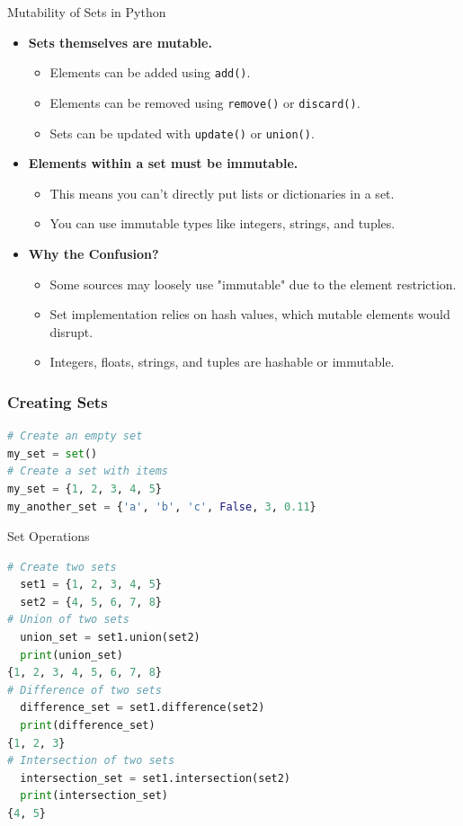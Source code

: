\begin{frame}{Mutability of Sets in Python}
    \begin{itemize}
      \item \textbf{Sets themselves are mutable.}
        \begin{itemize}
          \item Elements can be added using \texttt{add()}.
          \item Elements can be removed using \texttt{remove()} or \texttt{discard()}.
          \item Sets can be updated with \texttt{update()} or \texttt{union()}.
        \end{itemize}
      \item \textbf{Elements within a set must be immutable.}
        \begin{itemize}
          \item This means you can't directly put lists or dictionaries in a set.
          \item You can use immutable types like integers, strings, and tuples.
        \end{itemize}
      \item \textbf{Why the Confusion?}
        \begin{itemize}
          \item Some sources may loosely use "immutable" due to the element restriction.
          \item Set implementation relies on hash values, which mutable elements would disrupt.
          \item Integers, floats, strings, and tuples are hashable or immutable.
        \end{itemize}
    \end{itemize}
\end{frame}

    \begin{frame}[fragile]
        \frametitle{Creating Sets}
        \begin{lstlisting}[language=Python]
# Create an empty set
my_set = set()
# Create a set with items
my_set = {1, 2, 3, 4, 5}
my_another_set = {'a', 'b', 'c', False, 3, 0.11}
        \end{lstlisting}            
    \end{frame}

\begin{frame}[fragile]{Set Operations}
    \begin{lstlisting}[language=Python]
# Create two sets
  set1 = {1, 2, 3, 4, 5}  
  set2 = {4, 5, 6, 7, 8}
# Union of two sets
  union_set = set1.union(set2)
  print(union_set)
{1, 2, 3, 4, 5, 6, 7, 8} 
# Difference of two sets
  difference_set = set1.difference(set2)
  print(difference_set)
{1, 2, 3}
# Intersection of two sets
  intersection_set = set1.intersection(set2)
  print(intersection_set)
{4, 5}
    \end{lstlisting}
\end{frame}

